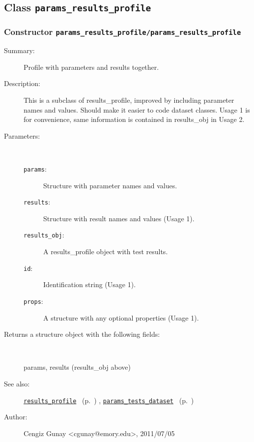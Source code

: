 \subsection{Class \texttt{params\_results\_profile}}%
%
\label{ref_params_results_profile}%
\hypertarget{ref_params_results_profile}{}%
\subsubsection[Constructor \texttt{params\_results\_profile}]{Constructor \texttt{params\_results\_profile/params\_results\_profile}}%
%
\label{ref_params_results_profile__params_results_profile}%
\hypertarget{ref_params_results_profile__params_results_profile}{}%
\begin{description}
\item[Summary:]Profile with parameters and results together.
%
%
\item[Description:]%
This is a subclass of results\_profile, improved by including
 parameter names and values. Should make it easier to code dataset
 classes. Usage 1 is for convenience, same information is contained in
 results\_obj in Usage 2.
\item[Parameters:]~
\begin{description}%
\item[\texttt{params}:]
 Structure with parameter names and values.
\item[\texttt{results}:]
 Structure with result names and values (Usage 1).
\item[\texttt{results\_obj}:]
 A results\_profile object with test results.
\item[\texttt{id}:]
 Identification string (Usage 1).
\item[\texttt{props}:]
 A structure with any optional properties (Usage 1).
\end{description}%
%
\item[Returns a structure object with the following fields:
]~

   params, results (results\_obj above)
%
%
\item[See also:]%
\hyperlink{ref_results_profile}{\texttt{results\_profile}}%
\ (p.~\pageref{ref_results_profile})%
%
, \hyperlink{ref_params_tests_dataset}{\texttt{params\_tests\_dataset}}%
\ (p.~\pageref{ref_params_tests_dataset})%
%
%
\item[Author:]%
Cengiz Gunay <cgunay@emory.edu>, 2011/07/05
%
\end{description}
\methodline%
